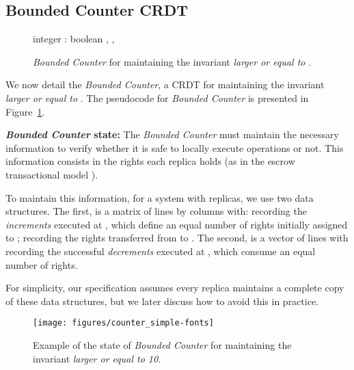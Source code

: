 \documentclass[conference]{IEEEtran}
\newcommand{\InvCounter}{\emph{Bounded Counter}}
\begin{document}
\subsection{Bounded Counter CRDT}



\begin{figure}[t]
\begin{algorithmic}
	\Initial{[[0,0,...,0], ..., [0,0,...,0]], [0,0,...,0], }
\EndPayloadML
{}
	\Let 
\EndQuery
{} integer 
	\Let{}
\EndQuery
{}
	\Let{}
	\Let{}
\EndUpdate
{}
	\Pre{}
	\Let{}
	\Let{}
\EndUpdate
{}: boolean 
	\Pre{}
	\Let{}
	\Let{}
\EndUpdate
{}
	\Let , 
	\Let , 
\EndUpdate
\end{algorithmic}
\vspace{-2ex}
\caption{\InvCounter{} for maintaining the invariant \emph{larger or equal to }.}\label{fig:invcounter:spec}
\vspace{-2ex}
\end{figure}

We now detail the \InvCounter{}, a CRDT for maintaining the invariant \emph{larger or equal to }. The pseudocode for \InvCounter{} is presented in Figure~\ref{fig:invcounter:spec}.

{\bf \InvCounter{} state:} 
The \InvCounter{} must maintain the necessary information to verify 
whether it is safe to locally execute operations or not.
This information consists in the rights each replica holds 
(as in the escrow transactional model \cite{escrow}).

To maintain this information, for a system with  replicas,
we use two data structures.
The first,  is a matrix of  lines by  columns with:
 recording the \emph{increments} executed at , 
which define an equal number of rights initially assigned to ; 
 recording the rights transferred from  to .
The second,  is a vector of  lines with 
 recording the successful \emph{decrements} executed at , 
which consume an equal number of rights.

For simplicity, our specification assumes every replica maintains a complete
copy of these data structures, but we later discuss how to avoid this in practice.

\begin{figure}[t]
\centering
\texttt{[image: figures/counter\_simple-fonts]}
\vspace{-2ex}
\caption{Example of the state of \InvCounter{} for maintaining the invariant \emph{larger or equal to 10}.}
\label{fig:invcounter}
\end{figure}
\end{document}

